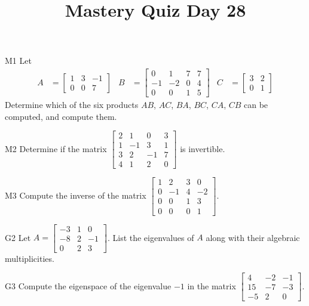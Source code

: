 \documentclass{sbgLAquiz}
\title{Mastery Quiz Day 28 }
\begin{document}
\begin{problem}{M1}
Let
\begin{align*}
A &= \begin{bmatrix} 1 & 3 & -1  \\ 0 & 0 & 7  \end{bmatrix} & B &= \begin{bmatrix} 0 & 1 & 7 & 7 \\ -1 & -2 & 0 & 4 \\ 0 & 0 & 1 & 5 \end{bmatrix} & C&=\begin{bmatrix} 3 & 2 \\ 0 & 1 \end{bmatrix}
\end{align*}
Determine which of the six products $AB$, $AC$, $BA$, $BC$, $CA$, $CB$ can be computed, and compute them.
\end{problem}

\begin{problem}{M2}
Determine if the matrix $\begin{bmatrix} 2 & 1 & 0 & 3 \\ 1 & -1 & 3 & 1 \\ 3 & 2 & -1 & 7 \\ 4 & 1 & 2 & 0 \end{bmatrix}$ is invertible.
\end{problem}
\newpage

\begin{problem}{M3}
Compute the inverse of the matrix $\begin{bmatrix} 1 & 2 & 3 & 0 \\ 0 & -1 & 4 & -2 \\ 0 & 0 & 1 & 3 \\ 0 & 0 & 0 & 1 \end{bmatrix}$.
\end{problem}

\begin{problem}{G2}
Let $A= \begin{bmatrix}-3 & 1 & 0 \\ -8 & 2 & -1 \\ 0 & 2 & 3\end{bmatrix}$.
List the eigenvalues of $A$ along with their algebraic multiplicities.
\end{problem}
\newpage

\begin{problem}{G3}
Compute the eigenspace of the eigenvalue $-1$ in the matrix $\begin{bmatrix} 4 & -2 & -1 \\ 15 & -7 & -3 \\ -5 & 2 & 0 \end{bmatrix}$.
\end{problem}
\end{document}
